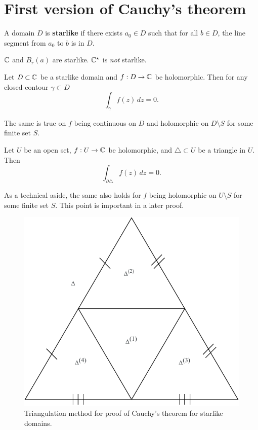 \section{First version of Cauchy's theorem}

\begin{definition}[]
    A domain $D$ is \textbf{starlike} if there exists $a_0 \in D$
    such that for all $b \in D$, the line segment from $a_0$ to $b$
    is in $D$.
\end{definition}

\begin{example}
    $\mathbb{C}$ and $B_r(a)$ are starlike. $\mathbb{C}^\star$ is \emph{not} starlike.
\end{example}

\begin{theorem}
    Let $D \subset \mathbb{C}$ be a starlike domain
    and $f: D \to \mathbb{C}$ be holomorphic.
    Then for any closed contour $\gamma \subset D$
    \[
        \int_\gamma f(z) \, dz = 0.
    \]
\end{theorem}

The same is true on $f$ being continuous on $D$
and holomorphic on $D \setminus S$ for some finite set $S$.

\begin{lemma}[]
    Let $U$ be an open set, $f: U \to \mathbb{C}$ be holomorphic, 
    and $\triangle \subset U$ be a triangle in $U$.
    Then
    \[
        \int_{\partial\triangle} f(z) \, dz = 0.
    \]
\end{lemma}

As a technical aside, the same also holds for $f$ being holomorphic on 
$U \setminus S$ for some finite set $S$.
This point is important in a later proof.

\begin{figure}[]
    \centering
    \includegraphics[width=0.5\linewidth]{images/triangulation-cauchy.pdf}
    \caption{Triangulation method for proof of Cauchy's theorem for starlike domains.}
    \label{fig:triangulation-cauchy}
\end{figure}

